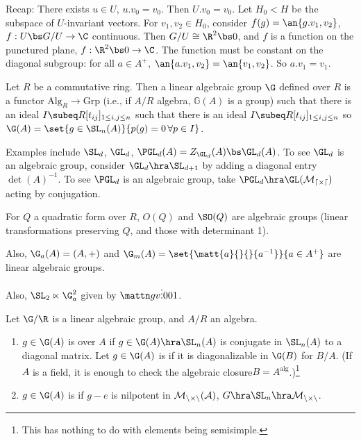
Recap: There exists $u\in U$, $u.v_0=v_0$. Then $U.v_0=v_0$. Let $H_0<H$ be the subspace of $U$-invariant vectors. For $v_1,v_2\in H_0$, consider $f(g) = \an{g.v_1,v_2}$, $f:U\bs G/U\to \C$ continuous. Then $G/U\cong \R^2\bs 0$, and $f$ is a function on the punctured plane, $f:\R^2\bs 0 \to \C$. 
The function must be constant on the diagonal subgroup: for all $a\in A^+$, $\an{a.v_1,v_2}=\an{v_1,v_2}$. So $a.v_1=v_1$. 

\begin{df}
Let $R$ be a commutative ring. Then a linear algebraic group $\G$ defined over $R$ is a functor $\text{Alg}_R\to \text{Grp}$ (i.e., if $A/R$ algebra, $\mathbb G(A)$ is a group) such that there is an ideal $I\subeq R[t_{ij}]_{1\le i,j\le n}$ such that there is an ideal $I\subeq R[t_{ij}]_{1\le i,j\le n}$ so $\G(A) = \set{g\in \SL_n(A)}{p(g)=0\,\forall p\in I}$. 
\end{df}
\begin{ex}
Examples include $\SL_d$, $\GL_d$, $\PGL_d(A) = Z_{\GL_d}(A)\bs \GL_d(A)$. 
To see $\GL_d$ is an algebraic group, consider $\GL_d\hra \SL_{d+1}$ by adding a diagonal entry $\det(A)^{-1}$. 
To see $\PGL_d$ is an algebraic group, take $\PGL_d\hra \GL(\cal M_{d\times d})$ acting by conjugation. 

For $Q$ a quadratic form over $R$, $O(Q)$ and $\SO(Q)$ are algebraic groups (linear transformations preserving $Q$, and those with determinant 1). 

Also, $\G_a(A)=(A,+)$ and $\G_m(A)=\set{\matt{a}{}{}{a^{-1}}}{a\in A^+}$ are linear algebraic groups. 

Also, $\SL_2\ltimes \G_a^2$ given by $\mattn g{}v{}{}{\vdots}001$. 
\end{ex}
\begin{df}
Let $\G/\R$ is a linear algebraic group, and $A/R$ an algebra. 
\begin{enumerate}
\item
$g\in \G(A)$ is  over $A$ if $g\in \G(A)\hra \SL_n(A)$ is conjugate in $\SL_n(A)$ to a diagonal matrix. 
Let $g\in\G(A)$ is  if it is diagonalizable in $\G(B)$ for $B/A$. (If $A$ is a field, it is enough to check the algebraic closure$B=A^{\text{alg}}$.)\footnote{This has nothing to do with elements being semisimple.}
\item
$g\in \G(A)$ is  if $g-e$ is nilpotent in $\cal M_{n\times n}(A)$, $G\hra \SL_n\hra \cal M_{n\times n}$. 
\end{enumerate}
\end{df}
